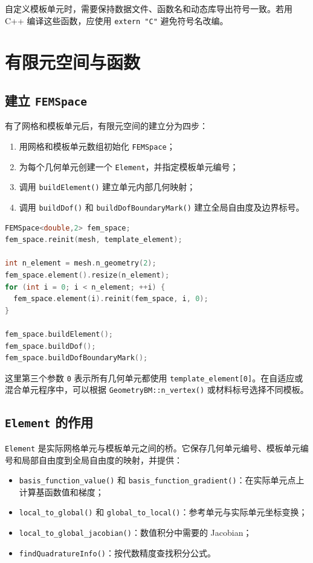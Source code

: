 \documentclass[UTF8,openany,zihao=-4,scheme=chinese]{ctexbook}
\newcommand{\class}[1]{\texttt{#1}}
\newcommand{\cmd}[1]{\texttt{#1}}
\begin{document}
自定义模板单元时，需要保持数据文件、函数名和动态库导出符号一致。若用 C++ 编译这些函数，应使用 \class{extern "C"} 避免符号名改编。

\chapter{有限元空间与函数}

\section{建立 \class{FEMSpace}}

有了网格和模板单元后，有限元空间的建立分为四步：

\begin{enumerate}[leftmargin=2em]
  \item 用网格和模板单元数组初始化 \class{FEMSpace}；
  \item 为每个几何单元创建一个 \class{Element}，并指定模板单元编号；
  \item 调用 \class{buildElement()} 建立单元内部几何映射；
  \item 调用 \class{buildDof()} 和 \class{buildDofBoundaryMark()} 建立全局自由度及边界标号。
\end{enumerate}

\begin{lstlisting}[language=C++]
FEMSpace<double,2> fem_space;
fem_space.reinit(mesh, template_element);

int n_element = mesh.n_geometry(2);
fem_space.element().resize(n_element);
for (int i = 0; i < n_element; ++i) {
  fem_space.element(i).reinit(fem_space, i, 0);
}

fem_space.buildElement();
fem_space.buildDof();
fem_space.buildDofBoundaryMark();
\end{lstlisting}

这里第三个参数 \cmd{0} 表示所有几何单元都使用 \cmd{template\_element[0]}。在自适应或混合单元程序中，可以根据 \class{GeometryBM::n\_vertex()} 或材料标号选择不同模板。

\section{\class{Element} 的作用}

\class{Element} 是实际网格单元与模板单元之间的桥。它保存几何单元编号、模板单元编号和局部自由度到全局自由度的映射，并提供：

\begin{itemize}[leftmargin=2em]
  \item \class{basis\_function\_value()} 和 \class{basis\_function\_gradient()}：在实际单元点上计算基函数值和梯度；
  \item \class{local\_to\_global()} 和 \class{global\_to\_local()}：参考单元与实际单元坐标变换；
  \item \class{local\_to\_global\_jacobian()}：数值积分中需要的 Jacobian；
  \item \class{findQuadratureInfo()}：按代数精度查找积分公式。
\end{itemize}
\end{document}
